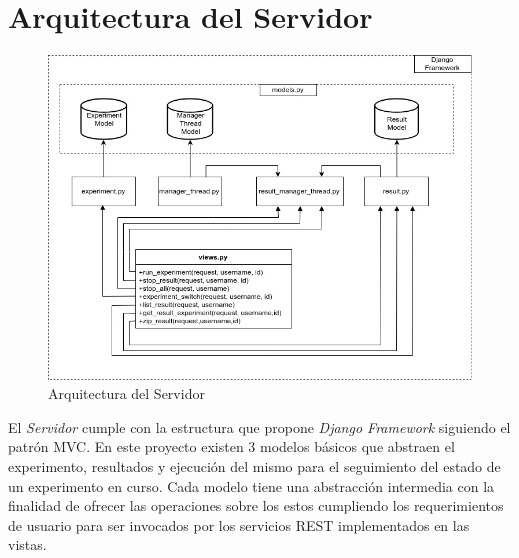 \section{Arquitectura del Servidor}
\begin{figure}[!htb]
    \includegraphics[width=\linewidth]{../figures/d20.jpg}
    \caption{Arquitectura del Servidor}
    \label{fig:d20}
\end{figure}

El \textit{Servidor} cumple con la estructura que propone \textit{Django Framework} siguiendo el 
patr\'on MVC. En este proyecto existen 3 modelos b\'asicos que abstraen el experimento, resultados
y ejecuci\'on del mismo para el seguimiento del estado de un experimento en curso.
Cada modelo tiene una abstracci\'on intermedia con la finalidad de ofrecer las operaciones sobre
los estos cumpliendo los requerimientos de usuario para ser invocados por los servicios REST implementados
en las vistas.

\newpage